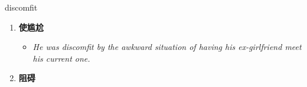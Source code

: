 
\begin{frame}
{\huge discomfit}
\begin{center}
\begin{enumerate}\Large
  \item \textbf{使尴尬}
  \begin{itemize}
    \item \em{\Large{He was discomfit by the awkward situation of having his ex-girlfriend meet his current one.}}
  \end{itemize}
  \item \textbf{阻碍}
\end{enumerate}
\end{center}
\end{frame}
